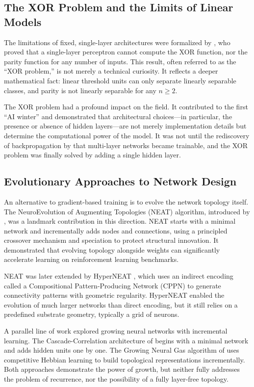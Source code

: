 \subsection{The XOR Problem and the Limits of Linear Models}

The limitations of fixed, single-layer architectures were formalized by
\citet{minsky1969perceptrons}, who proved that a single-layer perceptron
cannot compute the XOR function, nor the parity function for any number of
inputs. This result, often referred to as the ``XOR problem,'' is not merely
a technical curiosity. It reflects a deeper mathematical fact: linear
threshold units can only separate linearly separable classes, and parity is
not linearly separable for any $n \geq 2$.

The XOR problem had a profound impact on the field. It contributed to the
first ``AI winter'' and demonstrated that architectural choices---in
particular, the presence or absence of hidden layers---are not merely
implementation details but determine the computational power of the model.
It was not until the rediscovery of backpropagation by
\citet{rumelhart1986learning} that multi-layer networks became trainable,
and the XOR problem was finally solved by adding a single hidden layer.

\subsection{Evolutionary Approaches to Network Design}

An alternative to gradient-based training is to evolve the network topology
itself. The NeuroEvolution of Augmenting Topologies (NEAT) algorithm,
introduced by \citet{stanley2002evolving}, was a landmark contribution in
this direction. NEAT starts with a minimal network and incrementally adds
nodes and connections, using a principled crossover mechanism and
speciation to protect structural innovation. It demonstrated that evolving
topology alongside weights can significantly accelerate learning on
reinforcement learning benchmarks.

NEAT was later extended by HyperNEAT \citep{stanley2009hypercube}, which
uses an indirect encoding called a Compositional Pattern-Producing Network
(CPPN) to generate connectivity patterns with geometric regularity.
HyperNEAT enabled the evolution of much larger networks than direct
encoding, but it still relies on a predefined substrate geometry, typically
a grid of neurons.

A parallel line of work explored growing neural networks with incremental
learning. The Cascade-Correlation architecture of
\citet{fahlman1990cascade} begins with a minimal network and adds hidden
units one by one. The Growing Neural Gas algorithm of
\citet{fritzke1995growing} uses competitive Hebbian learning to build
topological representations incrementally. Both approaches demonstrate the
power of growth, but neither fully addresses the problem of recurrence,
nor the possibility of a fully layer-free topology.

